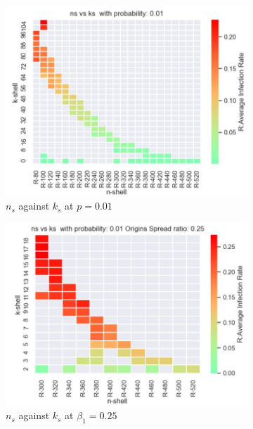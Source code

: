 \documentclass[11pt,a4,twocolumn]{article}
\begin{document}
\begin{figure}[h]
\begin{subfigure}{.5\textwidth}
	\centerline{\includegraphics[scale=.4]{ns-ks-01.jpg}}
	\caption{$n_{s}$ against $k_{s}$ at $p=0.01$}
	\label{fig:fig1}
\end{subfigure}
\begin{subfigure}{.5\textwidth}
	\centerline{\includegraphics[scale=.4]{ns-ks-01-25.jpg}}
	\caption{$n_{s}$ against $k_{s}$ at ${\beta}_{1} = 0.25$ }
	\label{fig:fig2}
\end{subfigure}
\begin{subfigure}{.5\textwidth}

\end{subfigure}
\end{figure}
\end{document}

